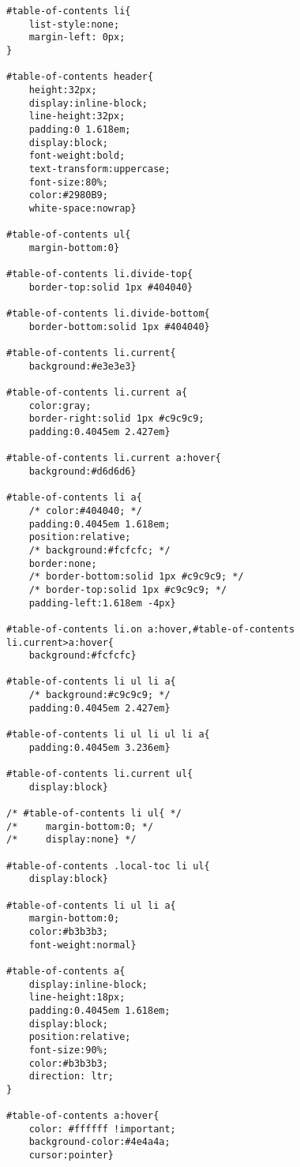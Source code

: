 \documentclass[11pt]{article}
\begin{document}
\begin{verbatim}
#table-of-contents li{
    list-style:none;
    margin-left: 0px;
}

#table-of-contents header{
    height:32px;
    display:inline-block;
    line-height:32px;
    padding:0 1.618em;
    display:block;
    font-weight:bold;
    text-transform:uppercase;
    font-size:80%;
    color:#2980B9;
    white-space:nowrap}

#table-of-contents ul{
    margin-bottom:0}

#table-of-contents li.divide-top{
    border-top:solid 1px #404040}

#table-of-contents li.divide-bottom{
    border-bottom:solid 1px #404040}

#table-of-contents li.current{
    background:#e3e3e3}

#table-of-contents li.current a{
    color:gray;
    border-right:solid 1px #c9c9c9;
    padding:0.4045em 2.427em}

#table-of-contents li.current a:hover{
    background:#d6d6d6}

#table-of-contents li a{
    /* color:#404040; */
    padding:0.4045em 1.618em;
    position:relative;
    /* background:#fcfcfc; */
    border:none;
    /* border-bottom:solid 1px #c9c9c9; */
    /* border-top:solid 1px #c9c9c9; */
    padding-left:1.618em -4px}

#table-of-contents li.on a:hover,#table-of-contents li.current>a:hover{
    background:#fcfcfc}

#table-of-contents li ul li a{
    /* background:#c9c9c9; */
    padding:0.4045em 2.427em}

#table-of-contents li ul li ul li a{
    padding:0.4045em 3.236em}

#table-of-contents li.current ul{
    display:block}

/* #table-of-contents li ul{ */
/*     margin-bottom:0; */
/*     display:none} */

#table-of-contents .local-toc li ul{
    display:block}

#table-of-contents li ul li a{
    margin-bottom:0;
    color:#b3b3b3;
    font-weight:normal}

#table-of-contents a{
    display:inline-block;
    line-height:18px;
    padding:0.4045em 1.618em;
    display:block;
    position:relative;
    font-size:90%;
    color:#b3b3b3;
    direction: ltr;
}

#table-of-contents a:hover{
    color: #ffffff !important;
    background-color:#4e4a4a;
    cursor:pointer}


\end{verbatim}
\end{document}

